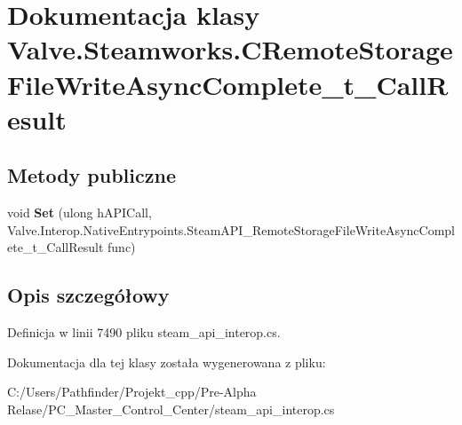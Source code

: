 \hypertarget{class_valve_1_1_steamworks_1_1_c_remote_storage_file_write_async_complete__t___call_result}{}\section{Dokumentacja klasy Valve.\+Steamworks.\+C\+Remote\+Storage\+File\+Write\+Async\+Complete\+\_\+t\+\_\+\+Call\+Result}
\label{class_valve_1_1_steamworks_1_1_c_remote_storage_file_write_async_complete__t___call_result}
\subsection*{Metody publiczne}
\begin{DoxyCompactItemize}
\item 
\mbox{\label{class_valve_1_1_steamworks_1_1_c_remote_storage_file_write_async_complete__t___call_result_a2965df799de6853a32b9f2e9e55eb5ab}} 
void {\bfseries Set} (ulong h\+A\+P\+I\+Call, Valve.\+Interop.\+Native\+Entrypoints.\+Steam\+A\+P\+I\+\_\+\+Remote\+Storage\+File\+Write\+Async\+Complete\+\_\+t\+\_\+\+Call\+Result func)
\end{DoxyCompactItemize}


\subsection{Opis szczegółowy}


Definicja w linii 7490 pliku steam\+\_\+api\+\_\+interop.\+cs.



Dokumentacja dla tej klasy została wygenerowana z pliku\+:\begin{DoxyCompactItemize}
\item 
C\+:/\+Users/\+Pathfinder/\+Projekt\+\_\+cpp/\+Pre-\/\+Alpha Relase/\+P\+C\+\_\+\+Master\+\_\+\+Control\+\_\+\+Center/steam\+\_\+api\+\_\+interop.\+cs\end{DoxyCompactItemize}
